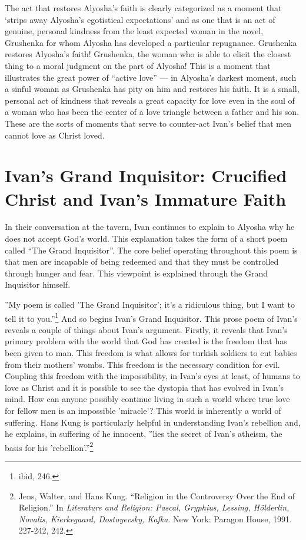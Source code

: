 The act that restores Alyosha's faith is clearly categorized as a moment that `strips away Alyosha's egotistical expectations' and as one that is an act of genuine, personal kindness from the least expected woman in the novel, Grushenka for whom Alyosha has developed a particular repugnance. Grushenka restores Alyosha's faith! Grushenka, the woman who is able to elicit the closest thing to a moral judgment on the part of Alyosha! This is a moment that illustrates the great power of ``active love'' --- in Alyosha's darkest moment, such a sinful woman as Grushenka has pity on him and restores his faith. It is a small, personal act of kindness that reveals a great capacity for love even in the soul of a woman who has been the center of a love triangle between a father and his son. These are the sorts of moments that serve to counter-act Ivan's belief that men cannot love as Christ loved.

\section{Ivan's Grand Inquisitor: Crucified Christ and Ivan's Immature Faith}
In their conversation at the tavern, Ivan continues to explain to Alyosha why he does not accept God's world. This explanation takes the form of a short poem called ``The Grand Inquisitor''. The core belief operating throughout this poem is that men are incapable of being redeemed and that they must be controlled through hunger and fear. This viewpoint is explained through the Grand Inquisitor himself.

''My poem is called 'The Grand Inquisitor'; it's a ridiculous thing, but I want to tell it to you.''\footnote{ibid, 246.} And so begins Ivan's Grand Inquisitor. This prose poem of Ivan's reveals a couple of things about Ivan's argument. Firstly, it reveals that Ivan's primary problem with the world that God has created is the freedom that has been given to man. This freedom is what allows for turkish soldiers to cut babies from their mothers' wombs. This freedom is the necessary condition for evil. Coupling this freedom with the impossibility, in Ivan's eyes at least, of humans to love as Christ and it is possible to see the dystopia that has evolved in Ivan's mind. How can anyone possibly continue living in such a world where true love for fellow men is an impossible 'miracle'? This world is inherently a world of suffering. Hans Kung is particularly helpful in understanding Ivan's rebellion and, he explains, in suffering of he innocent, ''lies the secret of Ivan's atheism, the basis for his 'rebellion'.''\footnote{Jens, Walter, and Hans Kung. ``Religion in the Controversy Over the End of Religion.'' In \emph{Literature and Religion: Pascal, Gryphius, Lessing, Hölderlin, Novalis, Kierkegaard, Dostoyevsky, Kafka}. New York: Paragon House, 1991. 227-242, 242.}

